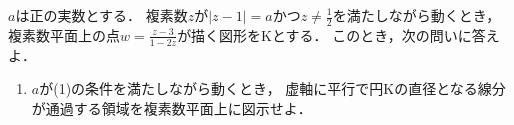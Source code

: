 \documentclass[../../main.tex]{subfiles}
\begin{document}
$a$は正の実数とする．
複素数$z$が$|z-1|=a$かつ$\displaystyle z\neq\frac{1}{2}$を満たしながら動くとき，
複素数平面上の点$\displaystyle w=\frac{z-3}{1-2z}$が描く図形をKとする．
このとき，次の問いに答えよ．
\begin{enumerate}
    $a$の条件を求めよ．
    また，そのときKの中心が表す複素数とKの半径を，それぞれ$a$を用いて表せ．
  \item$a$が(1)の条件を満たしながら動くとき，
    虚軸に平行で円Kの直径となる線分が通過する領域を複素数平面上に図示せよ．
\end{enumerate}
\end{document}

